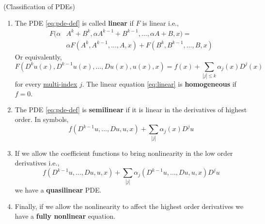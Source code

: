 \documentclass{bkcnotes}
\begin{document}
\begin{ndefn}(Classification of PDEs)
  \ \newline \vspace{-20px}
  \begin{enumerate}
  \item The PDE \eqref{eq:pde-def} is called \textbf{linear} if $F$ is
    linear i.e.,
    \begin{equation}
      \begin{aligned}
        F(\alpha &A^k + B^k, \alpha A^{k-1} + B^{k-1}, \ldots, \alpha A + B,x)
        = \\
        &\alpha F(A^k,A^{k-1},\ldots,A,x) + F(B^k,B^{k-1},\ldots,B,x)
      \end{aligned}
    \end{equation}
    Or equivalently,
    \begin{equation}
      \label{eq:linear}
      F(D^ku(x),D^{k-1}u(x),\ldots,Du(x),u(x),x) =
      f(x) + \sum_{|j| \leq k} \alpha_j(x)D^j(x)
    \end{equation}
    for every
    \href{http://en.wikipedia.org/wiki/Multi-index_notation}{multi-index}
    $j$. The linear equation \eqref{eq:linear} is \textbf{homogeneous}
    if $f = 0$.
  \item The PDE \eqref{eq:pde-def} is \textbf{semilinear} if it is
    linear in the derivatives of highest order. In symbols,
    \begin{equation}
      \label{eq:semilinear}
      f(D^{k-1}u,\ldots,Du,u,x) + \sum_{|j|}\alpha_j(x)D^ju
    \end{equation}
  \item If we allow the coefficient functions to bring nonlinearity in
    the low order derivatives i.e.,
    \begin{equation}
      \label{eq:quasilinear}
      f(D^{k-1}u,\ldots,Du,u,x) + \sum_{|j|}\alpha_j(D^{k-1}u,\ldots,Du,u,x)D^ju
    \end{equation}
    we have a \textbf{quasilinear} PDE.
  \item Finally, if we allow the nonlinearity to affect the highest
    order derivatives we have a \textbf{fully nonlinear} equation.
  \end{enumerate}
\end{ndefn}
\end{document}
